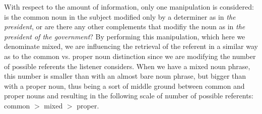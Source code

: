With respect to the amount of information, only one manipulation is considered: is the common noun in the subject modified only by a determiner as in \textit{the president}, or are there any other complements that modifiy the noun as in \textit{the president of the government}? By performing this manipulation, which here we denominate mixed, we are influencing the retrieval of the referent in a similar way as to the common vs. proper noun distinction since we are modifying the number of possible referents the listener considers. When we have a mixed noun phrase, this number is smaller than with an almost bare noun phrase, but bigger than with a proper noun, thus being a sort of middle ground between common and proper nouns and resulting in the following scale of number of possible referents: common $>$ mixed $>$ proper.\\ 
